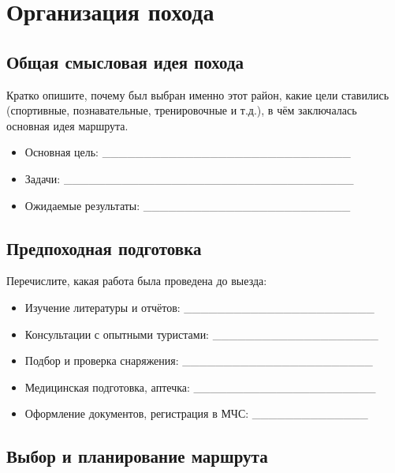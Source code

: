 \chapter{Организация похода}
\label{ch:orginfo}

\section{Общая смысловая идея похода}

Кратко опишите, почему был выбран именно этот район, какие цели ставились (спортивные, познавательные, тренировочные и т.д.), в чём заключалась основная идея маршрута.

\begin{itemize}
    \item Основная цель: \_\_\_\_\_\_\_\_\_\_\_\_\_\_\_\_\_\_\_\_\_\_\_\_\_\_\_\_\_\_
    \item Задачи: \_\_\_\_\_\_\_\_\_\_\_\_\_\_\_\_\_\_\_\_\_\_\_\_\_\_\_\_\_\_\_\_\_\_\_
    \item Ожидаемые результаты: \_\_\_\_\_\_\_\_\_\_\_\_\_\_\_\_\_\_\_\_\_\_\_\_\_
\end{itemize}

\section{Предпоходная подготовка}

Перечислите, какая работа была проведена до выезда:
\begin{itemize}
    \item Изучение литературы и отчётов: \_\_\_\_\_\_\_\_\_\_\_\_\_\_\_\_\_\_\_\_\_\_\_
    \item Консультации с опытными туристами: \_\_\_\_\_\_\_\_\_\_\_\_\_\_\_\_\_\_\_\_
    \item Подбор и проверка снаряжения: \_\_\_\_\_\_\_\_\_\_\_\_\_\_\_\_\_\_\_\_\_\_\_
    \item Медицинская подготовка, аптечка: \_\_\_\_\_\_\_\_\_\_\_\_\_\_\_\_\_\_\_\_\_\_
    \item Оформление документов, регистрация в МЧС: \_\_\_\_\_\_\_\_\_\_\_\_\_\_
\end{itemize}

\section{Выбор и планирование маршрута}

